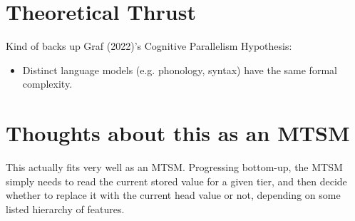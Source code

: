 \section*{Theoretical Thrust}

Kind of backs up Graf (2022)'s Cognitive Parallelism Hypothesis:

\begin{itemize}
  \item Distinct language models (e.g. phonology, syntax) have the same formal complexity.
\end{itemize}

\section*{Thoughts about this as an MTSM}

This actually fits very well as an MTSM. Progressing bottom-up, the MTSM simply needs to read the current stored value for a given tier, and then decide whether to replace it with the current head value or not, depending on some listed hierarchy of features.
